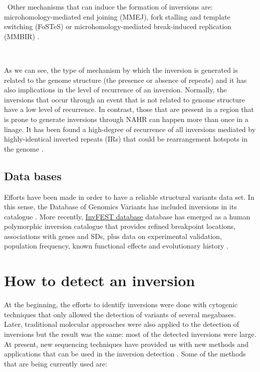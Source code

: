 \documentclass[a4paper,12pt]{article}
\begin{document}
\
Other mechanisms that can induce the formation of inversions are: microhomology-mediated end joining (MMEJ), fork stalling and template switching (FoSTeS) or microhomology-mediated break-induced replication (MMBIR) \cite{vicente-salvador_detailed_2017}. 

\

As we can see, the type of mechanism by which the inversion is generated is related to the genome structure (the presence or absence of repeats) and it has also implications in the level of recurrence of an inversion. Normally, the inversions that occur through an event that is not related to genome structure have a low level of recurrence. In contrast, those that are present in a region that is prone to generate inversions through NAHR can happen more than once in a linage. It has been found a high-degree of recurrence of all inversions mediated by highly-identical inverted repeats (IRs) that could be rearrangement hotspots in the genome \cite{giner-delgado_evolutionary_2019}. 

\subsection{Data bases}
Efforts have been made in order to have a reliable structural variants data set. In this sense, the Database of Genomics Variants has included inversions in its catalogue \cite{puig_human_2015}. More recently, \href{http://invfestdb.uab.cat/}{InvFEST database} database has emerged as a human polymorphic inversion catalogue that provides refined breakpoint locations, associations with genes and SDs, plus data on experimental validation, population frequency, known functional effects and evolutionary history \cite{martinez-fundichely_invfest_2014}.


\section{How to detect an inversion}

At the beginning, the efforts to identify inversions were done with cytogenic techniques that only allowed the detection of variants of several megabases. Later, traditional molecular approaches were also applied to the detection of inversions but the result was the same: most of the detected inversions were large. At present, new sequencing techniques have provided us with new methods and applications that can be used in the inversion detection \cite{puig_human_2015}. 
Some of the methods that are being currently used are:
\end{document}
